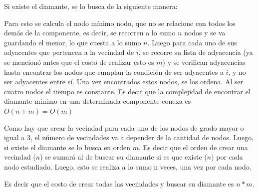 \documentclass[a4paper,11pt] {article}
\begin{document}
Si existe el diamante, se lo busca de la siguiente manera:

Para esto se calcula el nodo mínimo nodo, que no se relacione con todos los demás de la componente, es decir, se recorren a lo sumo $n$ nodos y se va guardando el menor, lo que cuesta a lo sumo $n$.
Luego para cada uno de sus adyacentes que pertencen a la vecindad de $i$, se recorre su lista de adyacencia (ya se mencionó antes que el costo de realizar esto es $m$) y se verifican adyacencias hasta encontrar los nodos que cumplan la condición de ser adyacentes a $i$, y no ser adyacentes entre sí.
Una vez encontrados estos nodos, se los ordena. Al ser cuatro nodos el tiempo es constante. 
Es decir que la complejidad de encontrar el diamante minimo en una determinada componente conexa es $O(n + m) = O(m)$

Como hay que crear la vecindad para cada uno de los nodos de grado mayor o igual a 3, el número de vecindades va a depender de la cantidad de nodos. Luego, si existe el diamante se lo busca en orden $m$.
Es decir que el orden de crear una vecindad ($n$) se sumará al de buscar su diamante si es que existe ($n$) por cada nodo estudiado. Luego, esto se realiza a lo sumo n veces, una vez por cada nodo.

Es decir que el costo de crear todas las vecindades y buscar su diamante es $n * m$.
\end{document}
